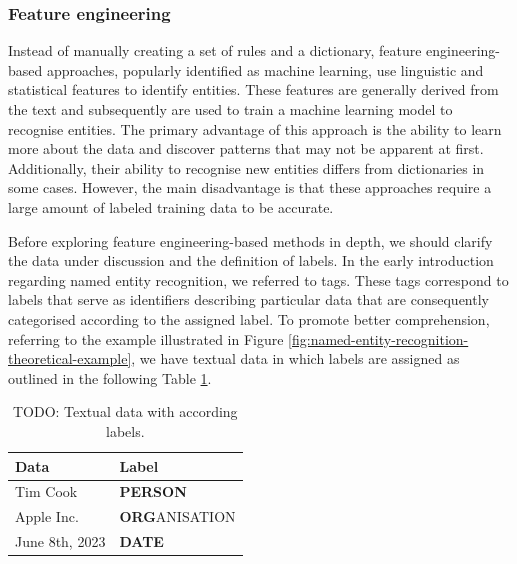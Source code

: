 \subsubsection*{Feature engineering}
\label{subsubsec:feature-engineering}
Instead of manually creating a set of rules and a dictionary, feature engineering-based approaches, popularly identified as machine learning, use linguistic and statistical features to identify entities. These features are generally derived from the text and subsequently are used to train a machine learning model to recognise entities. The primary advantage of this approach is the ability to learn more about the data and discover patterns that may not be apparent at first. Additionally, their ability to recognise new entities differs from dictionaries in some cases. However, the main disadvantage is that these approaches require a large amount of labeled training data to be accurate.

Before exploring feature engineering-based methods in depth, we should clarify the data under discussion and the definition of labels. In the early introduction regarding named entity recognition, we referred to tags. These tags correspond to labels that serve as identifiers describing particular data that are consequently categorised according to the assigned label. To promote better comprehension, referring to the example illustrated in Figure \ref{fig:named-entity-recognition-theoretical-example}, we have textual data in which labels are assigned as outlined in the following Table \ref{table:text-data-with-labels}.
\\
\begin{table}[ht]
    \centering
    \caption{TODO: Textual data with according labels.}
    \label{table:text-data-with-labels}
    \begin{tabular}[t]{ll}
        \hline
        Data&Label\\
        \hline
        Tim Cook&\textbf{PERSON}\\
        Apple Inc.&\textbf{ORG}ANISATION\\
        June 8th, 2023&\textbf{DATE}\\
        \hline
    \end{tabular}
\end{table}

